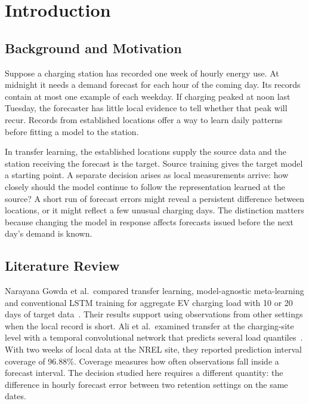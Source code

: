 \chapter{Introduction}\label{chap:introduction}

\section{Background and Motivation}

Suppose a charging station has recorded one week of hourly energy use. At midnight it needs a demand forecast for each hour of the coming day. Its records contain at most one example of each weekday. If charging peaked at noon last Tuesday, the forecaster has little local evidence to tell whether that peak will recur. Records from established locations offer a way to learn daily patterns before fitting a model to the station.

In transfer learning, the established locations supply the source data and the station receiving the forecast is the target. Source training gives the target model a starting point. A separate decision arises as local measurements arrive: how closely should the model continue to follow the representation learned at the source? A short run of forecast errors might reveal a persistent difference between locations, or it might reflect a few unusual charging days. The distinction matters because changing the model in response affects forecasts issued before the next day's demand is known.

\section{Literature Review}

Narayana Gowda et al.\ compared transfer learning, model-agnostic meta-learning and conventional LSTM training for aggregate EV charging load with 10 or 20 days of target data~\cite{gowda2026}. Their results support using observations from other settings when the local record is short. Ali et al.\ examined transfer at the charging-site level with a temporal convolutional network that predicts several load quantiles~\cite{ali2024}. With two weeks of local data at the NREL site, they reported prediction interval coverage of 96.88\%. Coverage measures how often observations fall inside a forecast interval. The decision studied here requires a different quantity: the difference in hourly forecast error between two retention settings on the same dates.

